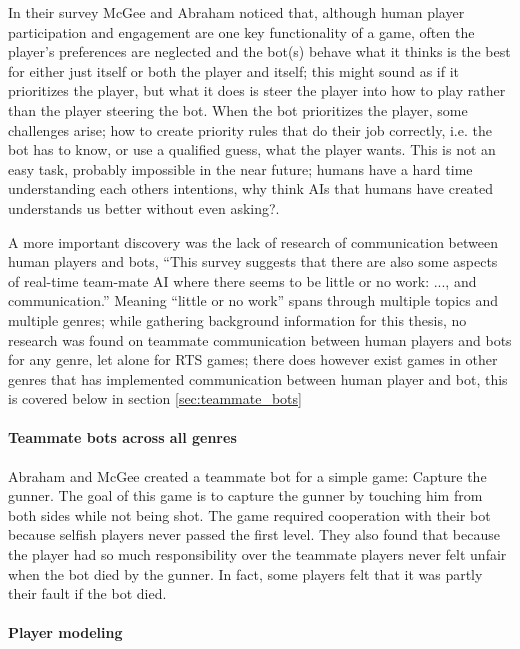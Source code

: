 In their survey\cite{mcgee10} McGee and Abraham noticed that, although human player participation and engagement are one key functionality of a game\cite{reynolds03}, often the player's preferences are neglected and the bot(s) behave what it thinks is the best for either just itself or both the player and itself; this might sound as if it prioritizes the player, but what it does is steer the player into how to play rather than the player steering the bot. When the bot prioritizes the player, some challenges arise; how to create priority rules that do their job correctly\cite{mcgee10}, i.e. the bot has to know, or use a qualified guess, what the player wants. This is not an easy task, probably impossible in the near future; humans have a hard time understanding each others intentions, why think AIs that humans have created understands us better\cite{norman07} without even asking?.

A more important discovery was the lack of research of communication between human players and bots, “This survey suggests that there are also some aspects of real-time team-mate AI where there seems to be little or no work: ..., and communication.”\cite{mcgee10} Meaning “little or no work” spans through multiple topics and multiple genres; while gathering background information for this thesis, no research was found on teammate communication between human players and bots for any genre, let alone for RTS games; there does however exist games in other genres that has implemented communication between human player and bot, this is covered below in section \ref{sec:teammate_bots}

\paragraph{Teammate bots across all genres}
Abraham and McGee created a teammate bot for a simple game: Capture the gunner\cite{abraham10}. The goal of this game is to capture the gunner by touching him from both sides while not being shot. The game required cooperation with their bot because selfish players never passed the first level. They also found that because the player had so much responsibility over the teammate players never felt unfair when the bot died by the gunner. In fact, some players felt that it was partly their fault if the bot died.



\paragraph{Player modeling}

